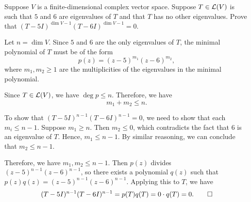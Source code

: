 \begin{exc}
\begin{exercise}
Suppose $V$ is a finite-dimensional complex vector space. Suppose
$T\in\mathcal{L}(V)$ is such that $5$ and $6$ are eigenvalues of $T$ and that $T$ has
no other eigenvalues. Prove that $(T-5I)^{\dim V-1}(T-6I)^{\dim V-1}=0$.
\end{exercise}
\begin{solution}
Let $n=\dim V$. Since $5$ and $6$ are the only eigenvalues of $T$, the minimal
polynomial of $T$ must be of the form
\[ p(z)=(z-5)^{m_1}(z-6)^{m_2}, \]
where $m_1,m_2\ge1$ are the multiplicities of the eigenvalues in the minimal
polynomial.

Since $T\in\mathcal{L}(V)$, we have $\deg p\le n$. Therefore, we have
\[ m_1+m_2\le n. \]

To show that $(T-5I)^{n-1}(T-6I)^{n-1}=0$, we need to show that each
$m_i\le n-1$. Suppose $m_1\ge n$. Then $m_2\le0$, which contradicts the fact
that $6$ is an eigenvalue of $T$. Hence, $m_1\le n-1$. By similar reasoning,
we can conclude that $m_2\le n-1$.

Therefore, we have $m_1,m_2\le n-1$. Then $p(z)$ divides
$(z-5)^{n-1}(z-6)^{n-1}$, so there exists a polynomial $q(z)$ such that
$p(z)q(z)=(z-5)^{n-1}(z-6)^{n-1}$. Applying this to $T$, we have
\[ (T-5I)^{n-1}(T-6I)^{n-1}=p(T)q(T)=0\cdot q(T)=0. \qedhere \]
\end{solution}


\end{exc}
